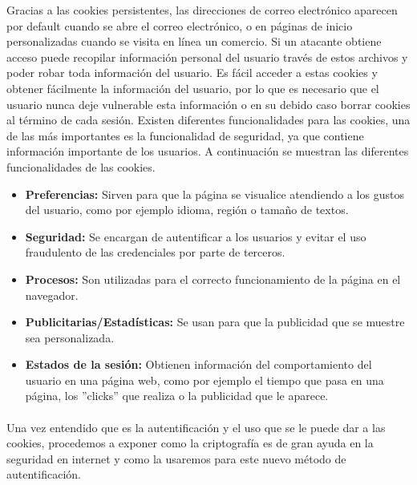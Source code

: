 \documentclass[12pt, a4paper, titlepage]{report}
\begin{document}
		Gracias a las cookies persistentes, las direcciones de correo electrónico aparecen por default cuando se abre el correo electrónico, o en páginas de inicio personalizadas cuando se visita en línea un comercio. Si un atacante obtiene acceso puede recopilar información personal del usuario través de estos archivos y poder robar toda información del usuario. Es fácil acceder a estas cookies y obtener fácilmente la información del usuario, por lo que es necesario que el usuario nunca deje vulnerable esta información o en su debido caso borrar cookies al término de cada sesión.
		Existen diferentes funcionalidades para las cookies, una de las más importantes es la funcionalidad de seguridad, ya que contiene información importante de los usuarios. A continuación se muestran las diferentes funcionalidades de las cookies.
		
		\begin{itemize}
		    \item \textbf{Preferencias:} Sirven para que la página se visualice atendiendo a los gustos del usuario, como por ejemplo idioma, región o tamaño de textos.
		    \item \textbf{Seguridad:} Se encargan de autentificar a los usuarios y evitar el uso fraudulento de las credenciales por parte de terceros.
		    \item \textbf{Procesos:} Son utilizadas para el correcto funcionamiento de la página en el navegador.
		    \item \textbf{Publicitarias/Estadísticas:} Se usan para que la publicidad que se muestre sea personalizada.
		    \item \textbf{Estados de la sesión:} Obtienen información del comportamiento del usuario en una página web, como por ejemplo el tiempo que pasa en una página, los ''clicks'' que realiza o la publicidad que le aparece.
		\end{itemize}
		
		\paragraph{}
		Una vez entendido que es la autentificación y el uso que se le puede dar a las cookies, procedemos a exponer como la criptografía es de gran ayuda en la seguridad en internet y como la usaremos para este nuevo método de autentificación.
		
		
\end{document}
